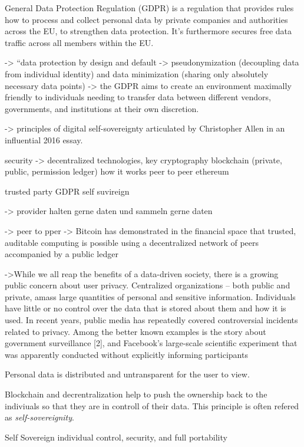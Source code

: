 General Data Protection Regulation (GDPR) is a regulation that provides rules how to process and collect personal data by private companies and authorities across the EU, to strengthen data protection. It's furthermore secures free data traffic across all members within the EU. \cite{gdpr}

-> “data protection by design and default
-> pseudonymization (decoupling data from individual identity) and data minimization (sharing only absolutely necessary data points)
-> the GDPR aims to create an environment maximally friendly to individuals needing to transfer data between different vendors, governments, and institutions at their own discretion.

-> principles of digital self-sovereignty articulated by Christopher Allen in an influential 2016 essay.


security -> decentralized technologies, key cryptography
blockchain (private, public, permission ledger)
how it works
peer to peer
ethereum

trusted party
GDPR
self suvireign

-> provider halten gerne daten und sammeln gerne daten

-> peer to pper
-> Bitcoin has demonstrated
in the financial space that trusted, auditable computing is possible
using a decentralized network of peers accompanied by a public
ledger

->While we all reap the benefits of a data-driven society, there
is a growing public concern about user privacy. Centralized
organizations – both public and private, amass large quantities
of personal and sensitive information. Individuals have little or
no control over the data that is stored about them and how it
is used. In recent years, public media has repeatedly covered
controversial incidents related to privacy. Among the better
known examples is the story about government surveillance
[2], and Facebook’s large-scale scientific experiment that was
apparently conducted without explicitly informing participants



Personal data is distributed and untransparent for the user to view.\cite[p. 1]{uPortWhitePaper}

Blockchain and decrentralization help to push the ownership back to the indiviuals so that they are in controll of their data. This principle is often refered as \textit{self-sovereignity}.\cite[p. 1]{uPortWhitePaper}






Self Sovereign individual control, security, and full portability
